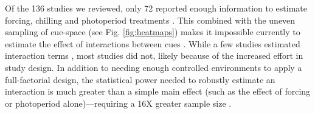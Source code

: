 \documentclass[11pt,letter]{article}
\begin{document}
Of the 136 studies we reviewed, only 72 reported enough information to estimate forcing, chilling and photoperiod treatments \citep{ettinger2020}. This combined with the uneven sampling of cue-space (see Fig. \ref{fig:heatmaps}) makes it impossible currently to estimate the effect of interactions between cues \citep{ettinger2020}. While a few studies estimated interaction terms \citep[e.g.,][]{zohner2014}, most studies did not, likely because of the increased effort in study design. In addition to needing enough controlled environments to apply a full-factorial design, the statistical power needed to robustly estimate an interaction is much greater than a simple main effect (such as the effect of forcing or photoperiod alone)---requiring a 16X greater sample size \citep{regotherstories}.\\ 

\end{document}
